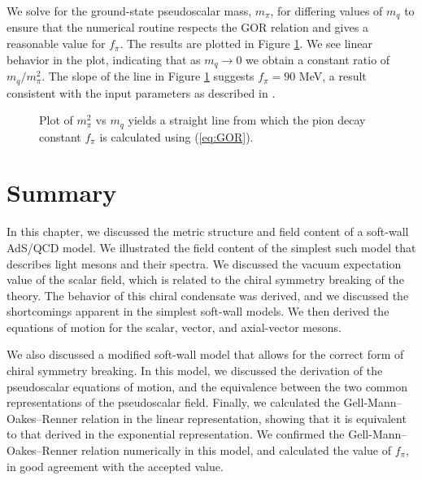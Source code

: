 We solve for the ground-state pseudoscalar mass, $m_{\pi}$, for
differing values of $m_{q}$ to ensure that the numerical routine
respects the GOR relation and gives a reasonable value for $f_{\pi}$.
The results are plotted in Figure \ref{fig:GOR}. We see linear behavior
in the plot, indicating that as $m_{q}\rightarrow0$ we obtain a constant
ratio of $m_{q}/m_{\pi}^{2}$. The slope of the line in Figure \ref{fig:GOR}
suggests $f_{\pi}=90$ MeV, a result consistent with the input parameters
as described in \cite{gherghetta-kelley}.

\begin{figure}[htb]
\caption{Plot of $m_{\pi}^{2}$ vs $m_{q}$ yields a straight line from which the pion decay constant $f_{\pi}$ is calculated using (\ref{eq:GOR}).}
\label{fig:GOR}
\end{figure}

\section{Summary}
In this chapter, we discussed the metric structure and field content of a soft-wall AdS/QCD model. 
We illustrated the field content of the simplest such model that describes light mesons and their spectra.
We discussed the vacuum expectation value of the scalar field, which is related to the chiral symmetry breaking of the theory.
The behavior of this chiral condensate was derived, and we discussed the shortcomings apparent in the simplest soft-wall models.
We then derived the equations of motion for the scalar, vector, and axial-vector mesons.

We also discussed a modified soft-wall model that allows for the correct form of chiral symmetry breaking.
In this model, we discussed the derivation of the pseudoscalar equations of motion, and the equivalence between the two common representations of the pseudoscalar field.
Finally, we calculated the Gell-Mann--Oakes--Renner relation in the linear representation, showing that it is equivalent to that derived in the exponential representation.
We confirmed the Gell-Mann--Oakes--Renner relation numerically in this model, and calculated the value of $f_\pi$, in good agreement with the accepted value.